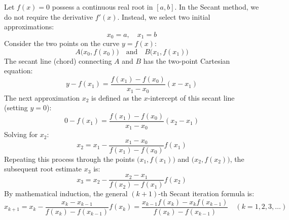 \begin{theorembox}
Let $f(x) = 0$ possess a continuous real root in $[a, b]$. In the Secant method, we do not require the derivative $f'(x)$. Instead, we select two initial approximations:
\begin{equation}
    x_0 = a, \quad x_1 = b
\end{equation}
Consider the two points on the curve $y = f(x)$:
\begin{equation}
    A\big(x_0, f(x_0)\big) \quad \text{and} \quad B\big(x_1, f(x_1)\big)
\end{equation}
The secant line (chord) connecting $A$ and $B$ has the two-point Cartesian equation:
\begin{equation}
    y - f(x_1) = \frac{f(x_1) - f(x_0)}{x_1 - x_0}(x - x_1)
\end{equation}
The next approximation $x_2$ is defined as the $x$-intercept of this secant line (setting $y = 0$):
\begin{equation}
    0 - f(x_1) = \frac{f(x_1) - f(x_0)}{x_1 - x_0}(x_2 - x_1)
\end{equation}
Solving for $x_2$:
\begin{equation}
    \boxed{x_2 = x_1 - \frac{x_1 - x_0}{f(x_1) - f(x_0)} f(x_1)}
\end{equation}
Repeating this process through the points $\big(x_1, f(x_1)\big)$ and $\big(x_2, f(x_2)\big)$, the subsequent root estimate $x_3$ is:
\begin{equation}
    x_3 = x_2 - \frac{x_2 - x_1}{f(x_2) - f(x_1)} f(x_2)
\end{equation}
By mathematical induction, the general $(k+1)$-th Secant iteration formula is:
\begin{equation}
    \boxed{x_{k+1} = x_k - \frac{x_k - x_{k-1}}{f(x_k) - f(x_{k-1})} f(x_k) = \frac{x_{k-1}f(x_k) - x_k f(x_{k-1})}{f(x_k) - f(x_{k-1})}} \quad (k = 1, 2, 3, \dots)
\end{equation}
\end{theorembox}

